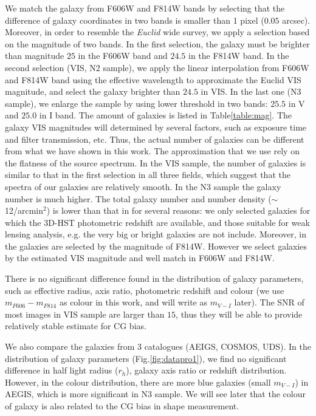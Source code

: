 \documentclass[useAMS,usenatbib]{mnras}
\begin{document}
We match the galaxy from F606W and F814W bands by selecting that
the difference of galaxy coordinates in two bands is smaller than 1
pixel ($0.05$ arcsec). Moreover, in order to resemble the {\it Euclid} 
wide survey, we apply a selection based on the magnitude of two bands. In the
first selection, the galaxy must be brighter than magnitude $25$ in
the F606W band and $24.5$ in the F814W band. In the second selection (VIS, N2 sample),
we apply the linear interpolation from F606W and F814W band using the
effective wavelength to approximate the Euclid VIS magnitude, and
select the galaxy brighter than $24.5$ in VIS. In the last one (N3
sample), we enlarge the sample by using lower threshold in two bands:
$25.5$ in V and $25.0$ in I band. The amount of galaxies is listed in
Table\ref{table:mag}.
%
The galaxy VIS magnitudes will determined by several factors, such as
exposure time and filter transmission, etc. Thus, the actual number of
galaxies can be different from what we have shown in this work. The
approximation that we use rely on the flatness of the source
spectrum. In the VIS sample, the number of galaxies is similar to that in
the first selection in all three fields, which suggest that the
spectra of our galaxies are relatively smooth. In the N3 sample the galaxy
number is much higher.
%
The total galaxy number and number density ($\sim$12/arcmin$^2$) is
lower than that in  for several reasons: we only selected
galaxies for  which the 3D-HST photometric redshift are available, and those
suitable for weak lensing analysis, e.g. the very big or bright
galaxies are not include. Moreover, in  the galaxies are selected
by the magnitude of F814W. However we select galaxies by the estimated
VIS magnitude and well match in F606W and F814W.

There is no significant difference found in the distribution of galaxy
parameters, such as effective radius, axis ratio, photometric redshift
and colour (we use $m_{F606}-m_{F814}$ as colour in this work, and
will write as $m_{V-I}$ later). The SNR of most images in VIS sample
are larger than $15$, thus they will be able to provide relatively
stable estimate for CG bias.

We also compare the galaxies from 3 catalogues (AEIGS, COSMOS, UDS).  In
the distribution of galaxy parameters (Fig.\ref{fig:datapro1}), we
find no significant difference in half light radius ($r_h$), galaxy
axis ratio or redshift distribution. However, in the colour
distribution, there are more blue galaxies (small $m_{V-I}$) in AEGIS,
which is more significant in N3 sample. We will see later that the
colour of galaxy is also related to the CG bias in shape measurement.
%
\end{document}
